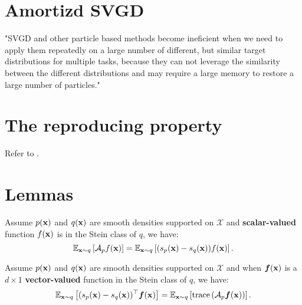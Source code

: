 \documentclass{article}
\begin{document}
\section{Amortizd SVGD}
"SVGD and other particle based methods become ineficient when we need to apply them repeatedly on a large number of different, but similar target distributions for multiple tasks, because they can not leverage the similarity between the different distributions and may require a large memory to restore a large number of particles."

 


\appendix
\section{The reproducing property}
Refer to \citep{sejdinovic2012rkhs}.\\
\section{Lemmas}
\begin{lemma} \label{lemma.1}
    Assume $p({\mathbf{x}})$ and $q({\mathbf{x}})$ are smooth densities supported on $\mathcal{X}$ and \textbf{scalar-valued} function $f({\mathbf{x}})$ is in the Stein class of $q$, we have:
    $$
    \mathbb{E}_{{\mathbf{x}} \sim q}\left[ \mathcal{A}_p f({\mathbf{x}}) \right] = \mathbb{E}_{{\mathbf{x}} \sim q}\left[  (s_p({\mathbf{x}}) - s_q({\mathbf{x}}))f({\mathbf{x}})\right].
    $$
\end{lemma}

\begin{lemma} \label{lemma.2}
    Assume $p({\mathbf{x}})$ and $q({\mathbf{x}})$ are smooth densities supported on $\mathcal{X}$ and when $\bm f({\mathbf{x}})$ is a $d \times 1$ \textbf{vector-valued} function in the Stein class of $q$, we have:
    $$
    \mathbb{E}_{{\mathbf{x}} \sim q}\left[ (s_p({\mathbf{x}}) - s_q({\mathbf{x}}))^\top \bm f({\mathbf{x}}) \right] = \mathbb{E}_{{\mathbf{x}} \sim q}\left[ \mathrm{trace}\left( \mathcal{A}_p \bm f({\mathbf{x}}) \right) \right].
    $$
\end{lemma}
\end{document}
